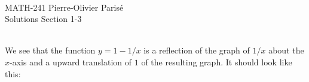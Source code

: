 


	\noindent \hrulefill \\
	MATH-241 \hfill Pierre-Olivier Paris{\'e}\\
	Solutions Section 1-3 \hfill \semester \\\vspace*{-1cm}
	
	\noindent\hrulefill
	
	\spc
	
	\\
	We see that the function $y= 1 - 1/x$ is a reflection of the graph of $1/x$ about the $x$-axis and a upward translation of $1$ of the resulting graph. It should look like this:
		\begin{figure}[h]
		\centering
\end{figure}
